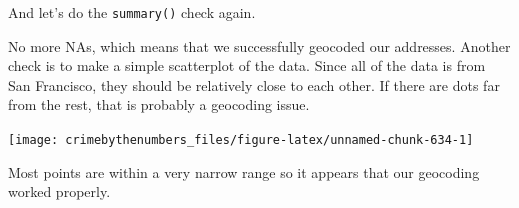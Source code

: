 \documentclass[
]{krantz}
\makeatletter
\newenvironment{Shaded}{\begin{snugshade}}{\end{snugshade}}
\newcommand{\CommentTok}[1]{\textcolor[rgb]{0.37,0.37,0.37}{\textit{#1}}}
\newcommand{\FunctionTok}[1]{\textcolor[rgb]{0,0,0}{#1}}
\newcommand{\NormalTok}[1]{#1}
\newcommand{\SpecialCharTok}[1]{\textcolor[rgb]{0,0,0}{#1}}
\newenvironment{kframe}{%
\medskip{}
\setlength{\fboxsep}{.8em}
 \def\at@end@of@kframe{}%
 \ifinner\ifhmode%
  \def\at@end@of@kframe{\end{minipage}}%
  \begin{minipage}{\columnwidth}%
 \fi\fi%
 \def\FrameCommand##1{\hskip\@totalleftmargin \hskip-\fboxsep
 \colorbox{shadecolor}{##1}\hskip-\fboxsep
     \hskip-\linewidth \hskip-\@totalleftmargin \hskip\columnwidth}%
 \MakeFramed {\advance\hsize-\width
   \@totalleftmargin\z@ \linewidth\hsize
   \@setminipage}}%
 {\par\unskip\endMakeFramed%
 \at@end@of@kframe}
\renewenvironment{Shaded}{\begin{kframe}}{\end{kframe}}
\makeatother
\begin{document}
And let's do the \texttt{summary()} check again.

\begin{Shaded}
\end{Shaded}

\begin{Shaded}
\end{Shaded}

No more NAs, which means that we successfully geocoded our
addresses. Another check is to make a simple scatterplot of
the data. Since all of the data is from San Francisco, they
should be relatively close to each other. If there are dots
far from the rest, that is probably a geocoding issue.

\begin{Shaded}
\end{Shaded}

\begin{center}\texttt{[image: crimebythenumbers\_files/figure-latex/unnamed-chunk-634-1]} \end{center}

Most points are within a very narrow range so it appears
that our geocoding worked properly.

  

\backmatter
\printindex
\end{document}

